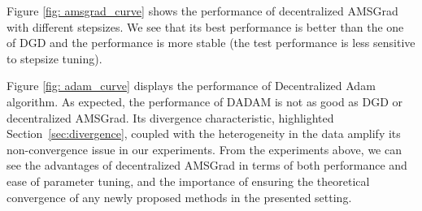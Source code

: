 \documentclass{article} %
\begin{document}
Figure \ref{fig: amsgrad_curve} shows the performance of decentralized AMSGrad with different stepsizes.
We see that its best performance is better than the one of DGD and the performance is more stable (the test performance is less sensitive to stepsize tuning).


Figure \ref{fig: adam_curve} displays the performance of Decentralized Adam algorithm.
As expected, the performance of DADAM is not as good as DGD or decentralized AMSGrad.
Its divergence characteristic, highlighted Section~\ref{sec:divergence}, coupled with the heterogeneity in the data amplify its non-convergence issue in our experiments.  
From the experiments above, we can see the advantages of decentralized AMSGrad in terms of both performance and ease of parameter tuning, and the importance of ensuring the theoretical convergence of any newly proposed methods in the presented setting. 
\end{document}

